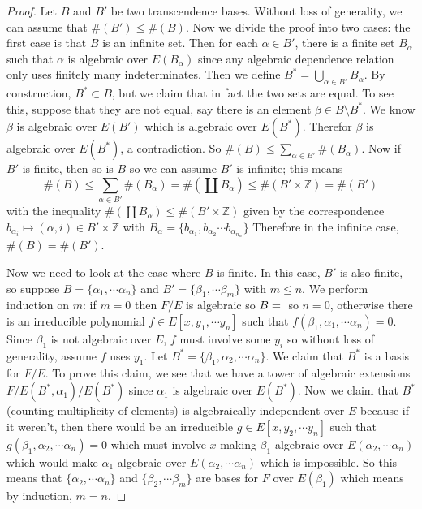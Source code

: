 \begin{proof} 
Let $B$ and $B'$ be two transcendence bases. Without loss of generality, we can
assume that $\#(B')\leq \#(B)$. Now we divide the proof into two cases: the
first case is that $B$ is an infinite set. Then for each $\alpha\in B'$, there
is a finite set $B_{\alpha}$ such that $\alpha$ is algebraic over
$E(B_{\alpha})$ since any algebraic dependence relation only uses finitely many
indeterminates. Then we define $B^*=\bigcup_{\alpha\in B'} B_{\alpha}$. By
construction, $B^*\subset B$, but we claim that in fact the two sets are
equal. To see this, suppose that they are not equal, say there is an element
$\beta\in B\setminus B^*$. We know $\beta$ is algebraic over $E(B')$ which is
algebraic over $E(B^*)$. Therefor $\beta$ is algebraic over $E(B^*)$, a
contradiction. So $\#(B)\leq \sum_{\alpha\in B'} \#(B_{\alpha})$. Now if $B'$ is
finite, then so is $B$ so we can assume $B'$ is infinite; this means
\begin{equation} \#(B)\leq \sum_{\alpha\in B'}\#(B_{\alpha})=\#(\coprod
B_{\alpha})\leq \#(B'\times\mathbb{Z})=\#(B')\end{equation} with the inequality $\#(\coprod
B_{\alpha}) \leq \#(B'\times \mathbb{Z})$ given by the correspondence
$b_{\alpha_i}\mapsto (\alpha,i)\in B'\times \mathbb{Z}$ with $B_\alpha =
\{b_{\alpha_1},b_{\alpha_2}\cdots b_{\alpha_{n_\alpha}}\}$ Therefore in the
infinite case, $\#(B)=\#(B')$.

Now we need to look at the case where $B$ is finite. In this case, $B'$ is also
finite, so suppose $B=\{\alpha_1,\cdots\alpha_n\}$ and
$B'=\{\beta_1,\cdots\beta_m\}$ with $m\leq n$. We perform induction on $m$: if
$m=0$ then $F/E$ is algebraic so $B=\null$ so $n=0$, otherwise there is an
irreducible polynomial $f\in E[x,y_1,\cdots y_n]$ such that
$f(\beta_1,\alpha_1,\cdots \alpha_n) = 0$. Since $\beta_1$ is not algebraic over
$E$, $f$ must involve some $y_i$ so without loss of generality, assume $f$ uses
$y_1$. Let $B^*=\{\beta_1,\alpha_2,\cdots\alpha_n\}$. We claim that $B^*$ is a
basis for $F/E$. To prove this claim, we see that we have a tower of algebraic
extensions $F/E(B^*,\alpha_1)/E(B^*)$ since $\alpha_1$ is algebraic over
$E(B^*)$. Now we claim that $B^*$ (counting multiplicity of elements) is
algebraically independent over $E$ because if it weren't, then there would be an
irreducible $g\in E[x,y_2,\cdots y_n]$ such that
$g(\beta_1,\alpha_2,\cdots\alpha_n)=0$ which must involve $x$ making $\beta_1$
algebraic over $E(\alpha_2,\cdots \alpha_n)$ which would make $\alpha_1$
algebraic over $E(\alpha_2,\cdots \alpha_n)$ which is impossible. So this means
that $\{\alpha_2,\cdots\alpha_n\}$ and $\{\beta_2,\cdots\beta_m\}$ are bases for
$F$ over $E(\beta_1)$ which means by induction, $m=n$. \end{proof}

